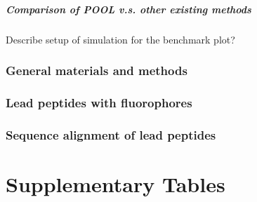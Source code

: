 \documentclass[11pt]{article}
\begin{document}
\subsubsection{Comparison of POOL v.s. other existing methods}
Describe setup of simulation for the benchmark plot?


\section{General materials and methods}
\section{Lead peptides with fluorophores}
\section{Sequence alignment of lead peptides}
\part{Supplementary Tables}



\end{document}
